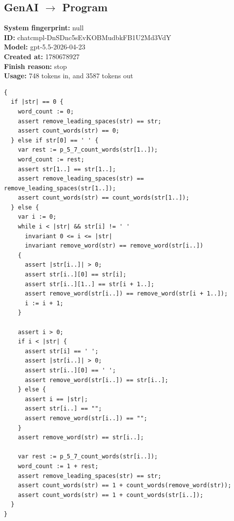 \documentclass{article}
\begin{document}
\subsection*{GenAI $\rightarrow$ Program}
\textbf{System fingerprint: }null
\\\textbf{ID: }chatcmpl-DnSDnc5sEvKOBMudbkFB1U2Md3VdY
\\\textbf{Model: }gpt-5.5-2026-04-23
\\\textbf{Created at: }1780678927
\\\textbf{Finish reason: }stop
\\\textbf{Usage: }748 tokens in, and 3587 tokens out
\begin{lstlisting}
{
  if |str| == 0 {
    word_count := 0;
    assert remove_leading_spaces(str) == str;
    assert count_words(str) == 0;
  } else if str[0] == ' ' {
    var rest := p_5_7_count_words(str[1..]);
    word_count := rest;
    assert str[1..] == str[1..];
    assert remove_leading_spaces(str) == remove_leading_spaces(str[1..]);
    assert count_words(str) == count_words(str[1..]);
  } else {
    var i := 0;
    while i < |str| && str[i] != ' '
      invariant 0 <= i <= |str|
      invariant remove_word(str) == remove_word(str[i..])
    {
      assert |str[i..]| > 0;
      assert str[i..][0] == str[i];
      assert str[i..][1..] == str[i + 1..];
      assert remove_word(str[i..]) == remove_word(str[i + 1..]);
      i := i + 1;
    }

    assert i > 0;
    if i < |str| {
      assert str[i] == ' ';
      assert |str[i..]| > 0;
      assert str[i..][0] == ' ';
      assert remove_word(str[i..]) == str[i..];
    } else {
      assert i == |str|;
      assert str[i..] == "";
      assert remove_word(str[i..]) == "";
    }
    assert remove_word(str) == str[i..];

    var rest := p_5_7_count_words(str[i..]);
    word_count := 1 + rest;
    assert remove_leading_spaces(str) == str;
    assert count_words(str) == 1 + count_words(remove_word(str));
    assert count_words(str) == 1 + count_words(str[i..]);
  }
}
\end{lstlisting}
\end{document}
